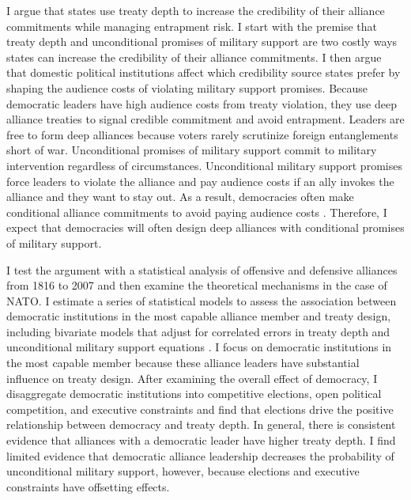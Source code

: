 \documentclass[12pt]{article}
\begin{document}
I argue that states use treaty depth to increase the credibility of their alliance commitments while managing entrapment risk.
I start with the premise that treaty depth and unconditional promises of military support are two costly ways states can increase the credibility of their alliance commitments.
I then argue that domestic political institutions affect which credibility source states prefer by shaping the audience costs of violating military support promises.
Because democratic leaders have high audience costs from treaty violation, they use deep alliance treaties to signal credible commitment and avoid entrapment.
Leaders are free to form deep alliances because voters rarely scrutinize foreign entanglements short of war. 
Unconditional promises of military support commit to military intervention regardless of circumstances.  
Unconditional military support promises force leaders to violate the alliance and pay audience costs if an ally invokes the alliance and they want to stay out.
As a result, democracies often make conditional alliance commitments to avoid paying audience costs \citep{Mattes2012, Chibaetal2015}.
Therefore, I expect that democracies will often design deep alliances with conditional promises of military support. 


I test the argument with a statistical analysis of offensive and defensive alliances from 1816 to 2007 and then examine the theoretical mechanisms in the case of NATO.
I estimate a series of statistical models to assess the association between democratic institutions in the most capable alliance member and treaty design, including bivariate models that adjust for correlated errors in treaty depth and unconditional military support equations \citep{Braumoelleretal2018}. 
I focus on democratic institutions in the most capable member because these alliance leaders have substantial influence on treaty design. 
After examining the overall effect of democracy, I disaggregate democratic institutions into competitive elections, open political competition, and executive constraints and find that elections drive the positive relationship between democracy and treaty depth. 
In general, there is consistent evidence that alliances with a democratic leader have higher treaty depth.
I find limited evidence that democratic alliance leadership decreases the probability of unconditional military support, however, because elections and executive constraints have offsetting effects. 
\end{document}
